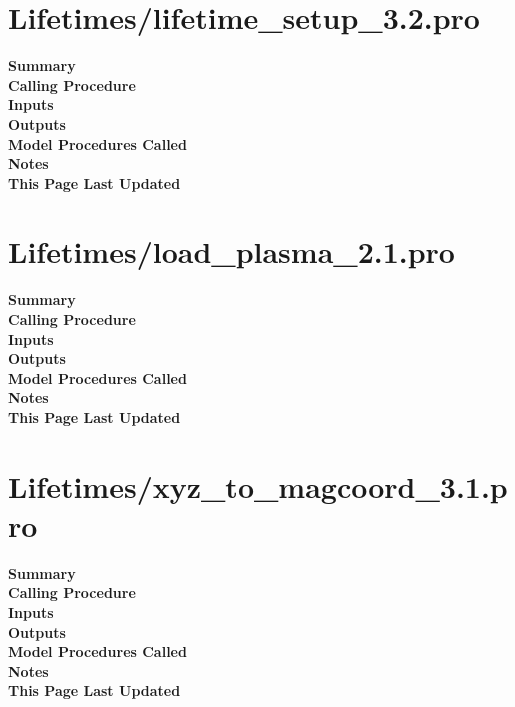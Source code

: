 \documentclass[11pt]{article}
\newcommand\descrip[1]{\textsf{\textbf{\large{#1}}}\\}
\begin{document}
\clearpage

\section{Lifetimes/lifetime\_setup\_3.2.pro} \label{sec:lifetime_setup}

\descrip{Summary}

\descrip{Calling Procedure}

\descrip{Inputs}

\descrip{Outputs}

\descrip{Model Procedures Called}

\descrip{Notes}

\descrip{This Page Last Updated}

\clearpage

\section{Lifetimes/load\_plasma\_2.1.pro} \label{sec:load_plasma}

\descrip{Summary}

\descrip{Calling Procedure}

\descrip{Inputs}

\descrip{Outputs}

\descrip{Model Procedures Called}

\descrip{Notes}

\descrip{This Page Last Updated}

\clearpage

\section{Lifetimes/xyz\_to\_magcoord\_3.1.pro} \label{sec:xyz_to_magcood}

\descrip{Summary}

\descrip{Calling Procedure}

\descrip{Inputs}

\descrip{Outputs}

\descrip{Model Procedures Called}

\descrip{Notes}

\descrip{This Page Last Updated}

\clearpage
\end{document}
